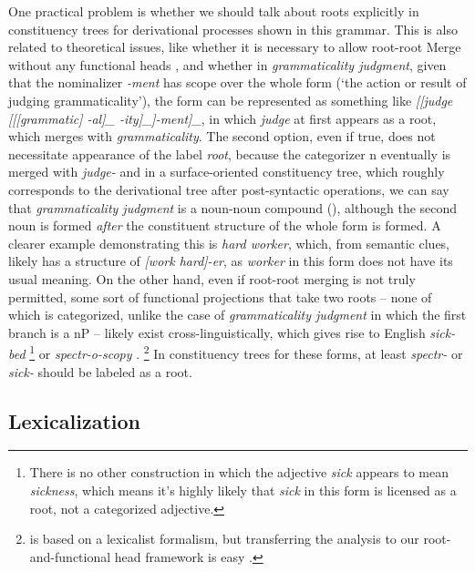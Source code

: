 \documentclass[UTF8, a4paper, oneside, scheme=plain, 12pt]{ctexrep}
\newcommand*{\term}[1]{\emph{#1}}
\newcommand{\form}[1]{\emph{#1}}
\newcommand{\translate}[1]{`#1'}
\begin{document}
{One practical problem is whether we should talk about roots explicitly in 
constituency trees for derivational processes shown in this grammar.
This is also related to theoretical issues,
like whether it is necessary to allow root-root Merge without any functional heads \citep{zhang2007root},
and whether in \form{grammaticality judgment},
given that the nominalizer \form{-ment} has scope over the whole form
(\translate{the action or result of judging grammaticality}),
the form can be represented
as something like \form{[[judge [[[grammatic] -al]_{} -ity]_{}]-ment]_{\text{N}}},
in which \form{judge} at first appears as a root,
which merges with \form{grammaticality}.
The second option, even if true, does not necessitate appearance of the label \term{root},
because the categorizer n eventually is merged with \form{judge-}
and in a surface-oriented constituency tree, which roughly corresponds to the derivational tree after post-syntactic operations, we can say that \form{grammaticality judgment} is a noun-noun compound
(),
although the second noun is formed \emph{after} the constituent structure of the whole form is formed.
A clearer example demonstrating this is \form{hard worker},
which, from semantic clues, likely has a structure of \form{[work hard]-er},
as \form{worker} in this form does not have its usual meaning.
On the other hand, even if root-root merging is not truly permitted,
some sort of functional projections that take two roots -- none of which is categorized,
unlike the case of \form{grammaticality judgment} in which the first branch is a nP --
likely exist cross-linguistically, which gives rise to English \form{sick-bed}%
\footnote{
    There is no other construction in which the adjective \form{sick} appears to mean \form{sickness},
    which means it's highly likely that \form{sick} in this form is licensed as a root,
    not a categorized adjective.
}
or \form{spectr-o-scopy} \citep{di2005decomposing,scher2014unifying}.%
\footnote{
    \citet{di2005decomposing} is based on a lexicalist formalism,
    but transferring the analysis to our root-and-functional head framework is easy
    \citep{scher2014unifying}.
}
In constituency trees for these forms, at least \form{spectr-} or \form{sick-} should be labeled as a root.

\subsection{Lexicalization}\label{sec:intro.theory.lexicon}

}
\end{document}
